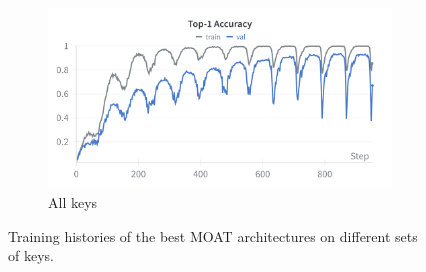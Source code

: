 \documentclass[a4paper,11pt,twoside]{report}
\theoremstyle{definition}
\begin{document}
\begin{figure}[H]
\begin{subfigure}{\linewidth}
\begin{minipage}{0.49\linewidth}
    \end{minipage}
    \hfill
    \begin{minipage}{0.49\linewidth}
        \centering
        \includegraphics[width=\linewidth]{img_appendix/acc_all_moat_all.png}
    \end{minipage}
    \caption{All keys}
\end{subfigure}

\caption{Training histories of the best MOAT architectures on different sets of keys.}
\end{figure}
\end{document}
